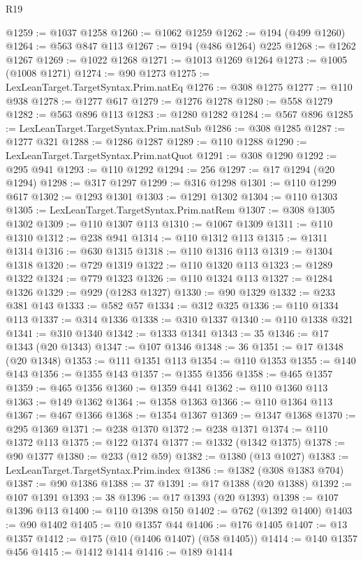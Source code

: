\begin{lexlean}{R19}
\begin{coremodule}
@1259 := @1037 @1258
@1260 := @1062 @1259
@1262 := @194 (@499 @1260)
@1264 := @563 @847 @113
@1267 := @194 (@486 @1264) @225
@1268 := @1262 @1267
@1269 := @1022 @1268
@1271 := @1013 @1269 @1264
@1273 := @1005 (@1008 @1271)
@1274 := @90 @1273
@1275 := LexLeanTarget.TargetSyntax.Prim.natEq
@1276 := @308 @1275
@1277 := @110 @938
@1278 := @1277 @617
@1279 := @1276 @1278
@1280 := @558 @1279
@1282 := @563 @896 @113
@1283 := @1280 @1282
@1284 := @567 @896
@1285 := LexLeanTarget.TargetSyntax.Prim.natSub
@1286 := @308 @1285
@1287 := @1277 @321
@1288 := @1286 @1287
@1289 := @110 @1288
@1290 := LexLeanTarget.TargetSyntax.Prim.natQuot
@1291 := @308 @1290
@1292 := @295 @941
@1293 := @110 @1292
@1294 := 256
@1297 := @17 @1294 (@20 @1294)
@1298 := @317 @1297
@1299 := @316 @1298
@1301 := @110 @1299 @617
@1302 := @1293 @1301
@1303 := @1291 @1302
@1304 := @110 @1303
@1305 := LexLeanTarget.TargetSyntax.Prim.natRem
@1307 := @308 @1305 @1302
@1309 := @110 @1307 @113
@1310 := @1067 @1309
@1311 := @110 @1310
@1312 := @238 @941
@1314 := @110 @1312 @113
@1315 := @1311 @1314
@1316 := @630 @1315
@1318 := @110 @1316 @113
@1319 := @1304 @1318
@1320 := @729 @1319
@1322 := @110 @1320 @113
@1323 := @1289 @1322
@1324 := @779 @1323
@1326 := @110 @1324 @113
@1327 := @1284 @1326
@1329 := @929 (@1283 @1327)
@1330 := @90 @1329
@1332 := @233 @381 @143
@1333 := @582 @57
@1334 := @312 @325
@1336 := @110 @1334 @113
@1337 := @314 @1336
@1338 := @310 @1337
@1340 := @110 @1338 @321
@1341 := @310 @1340
@1342 := @1333 @1341
@1343 := 35
@1346 := @17 @1343 (@20 @1343)
@1347 := @107 @1346
@1348 := 36
@1351 := @17 @1348 (@20 @1348)
@1353 := @111 @1351 @113
@1354 := @110 @1353
@1355 := @140 @143
@1356 := @1355 @143
@1357 := @1355 @1356
@1358 := @465 @1357
@1359 := @465 @1356
@1360 := @1359 @441
@1362 := @110 @1360 @113
@1363 := @149 @1362
@1364 := @1358 @1363
@1366 := @110 @1364 @113
@1367 := @467 @1366
@1368 := @1354 @1367
@1369 := @1347 @1368
@1370 := @295 @1369
@1371 := @238 @1370
@1372 := @238 @1371
@1374 := @110 @1372 @113
@1375 := @122 @1374
@1377 := @1332 (@1342 @1375)
@1378 := @90 @1377
@1380 := @233 (@12 @59)
@1382 := @1380 (@13 @1027)
@1383 := LexLeanTarget.TargetSyntax.Prim.index
@1386 := @1382 (@308 @1383 @704)
@1387 := @90 @1386
@1388 := 37
@1391 := @17 @1388 (@20 @1388)
@1392 := @107 @1391
@1393 := 38
@1396 := @17 @1393 (@20 @1393)
@1398 := @107 @1396 @113
@1400 := @110 @1398 @150
@1402 := @762 (@1392 @1400)
@1403 := @90 @1402
@1405 := @10 @1357 @44
@1406 := @176 @1405
@1407 := @13 @1357
@1412 := @175 (@10 (@1406 @1407) (@58 @1405))
@1414 := @140 @1357 @456
@1415 := @1412 @1414
@1416 := @189 @1414

\end{coremodule}
\end{lexlean}
